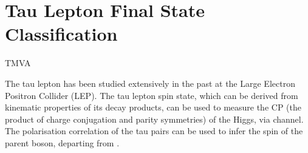 \chapter{Tau Lepton Final State Classification}
\label{chap:Tau}

%
{TMVA}%

The tau lepton has been studied extensively in the past at the Large Electron Positron Collider (LEP)\cite{Schael:2005am}. The tau lepton spin state, which can be derived from kinematic properties of its decay products, can be used to measure the CP (the product of charge conjugation and parity symmetries) of the Higgs, via \HiggsToTauTau channel\cite{Berge:2015nua}.  The polarisation correlation of the tau pairs can be used to infer the spin of the parent boson, departing \HiggsToTauTau from \ZToTauTau.

